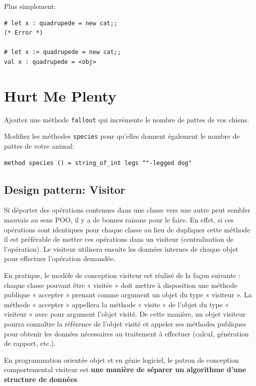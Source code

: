 \documentclass[a4paper]{article}
\begin{document}
Plus simplement:

\begin{verbatim}
# let x : quadrupede = new cat;;
(* Error *)

# let x :> quadrupede = new cat;;
val x : quadrupede = <obj>
\end{verbatim}

\section{Hurt Me Plenty}

Ajoutez une méthode \verb|fallout| qui incrémente le nombre de pattes de vos
chiens.

Modifiez les méthodes \verb|species| pour qu'elles donnent également le
nombre de pattes de votre animal:

\begin{verbatim}
method species () = string_of_int legs ^"-legged dog"
\end{verbatim}


\subsection{Design pattern: Visitor}

Si déporter des opérations contenues dans une classe vers une autre peut
sembler mauvais au sens POO, il y a de bonnes raisons pour le faire. En effet,
si ces opérations sont identiques pour chaque classe au lieu de dupliquer cette
méthode il est préférable de mettre ces opérations dans un visiteur
(centralisation de l'opération). Le visiteur utilisera ensuite les données
internes de chaque objet pour effectuer l'opération demandée.

En pratique, le modèle de conception visiteur est réalisé de la façon suivante
: chaque classe pouvant être « visitée » doit mettre à disposition une méthode
publique « accepter » prenant comme argument un objet du type « visiteur ». La
méthode « accepter » appellera la méthode « visite » de l'objet du type «
visiteur » avec pour argument l'objet visité. De cette manière, un objet
visiteur pourra connaître la référence de l'objet visité et appeler ses
méthodes publiques pour obtenir les données nécessaires au traitement à
effectuer (calcul, génération de rapport, etc.).

En programmation orientée objet et en génie logiciel, le patron de conception
comportemental visiteur est \textbf{une manière de séparer un algorithme d'une
structure de données}.
\end{document}
